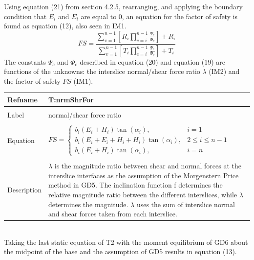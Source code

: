 \documentclass[12pt]{article}
\begin{document}
Using equation (21) from section 4.2.5, rearranging, and applying the boundary condition that $E_{i}$ and $E_{i}$ are equal to $0$, an equation for the factor of safety is found as equation (12), also seen in IM1.
\begin{equation}
FS=\frac{\displaystyle\sum_{v=1}^{n-1}{\left[R_{i}\displaystyle\prod_{c=i}^{n-1}{\frac{\Psi{}_{c}}{\Phi{}_{c}}}\right]}+R_{i}}{\displaystyle\sum_{v=1}^{n-1}{\left[T_{i}\displaystyle\prod_{c=i}^{n-1}{\frac{\Psi{}_{c}}{\Phi{}_{c}}}\right]}+T_{i}}
\end{equation}
The constants $\Psi{}_{c}$ and $\Phi{}_{c}$ described in equation (20) and equation (19) are functions of the unknowns: the interslice normal/shear force ratio $\lambda{}$ (IM2) and the factor of safety $FS$ (IM1).
~\newline
\noindent \begin{minipage}{\textwidth}
\begin{tabular}{p{} p{}}
\toprule \textbf{Refname} & \textbf{T:nrmShrFor}
\label{T:nrmShrFor}
\\ \midrule \\
Label & normal/shear force ratio
\\ \midrule \\
Equation & $FS=\begin{cases}
b_{i}\left(E_{i}+H_{i}\right)\tan\left(\alpha{}_{i}\right), & i=1\\
b_{i}\left(E_{i}+E_{i}+H_{i}+H_{i}\right)\tan\left(\alpha{}_{i}\right), & 2\leq{}i\leq{}n-1\\
b_{i}\left(E_{i}+H_{i}\right)\tan\left(\alpha{}_{i}\right), & i=n
\end{cases}$
\\ \midrule \\
Description & $\lambda{}$ is the magnitude ratio between shear and normal forces at the interslice interfaces as the assumption of the Morgenstern Price method in GD5. The inclination function f determines the relative magnitude ratio between the different interslices, while $\lambda{}$ determines the magnitude. $\lambda{}$ uses the sum of interslice normal and shear forces taken from each interslice.
\\ \bottomrule \end{tabular}
\end{minipage}\\
Taking the last static equation of T2 with the moment equilibrium of GD6 about the midpoint of the base and the assumption of GD5 results in equation (13).
\end{document}
